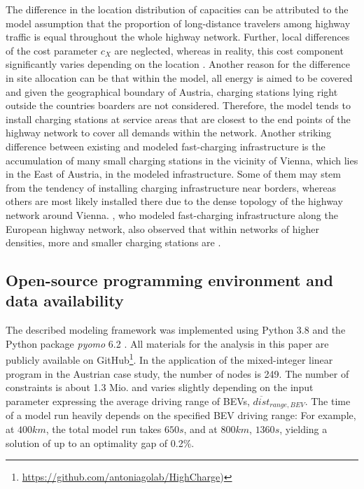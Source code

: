 \documentclass[journal,article,submit,pdftex,moreauthors]{Definitions/mdpi}
\begin{document}
    The difference in the location distribution of capacities can be attributed to the model assumption that the proportion of long-distance travelers among highway traffic is equal throughout the whole highway network. Further, local differences of the cost parameter $c_X$ are neglected, whereas in reality, this cost component significantly varies depending on the location \citep{Serradilla2017}. Another reason for the difference in site allocation can be that within the model, all energy is aimed to be covered and given the geographical boundary of Austria, charging stations lying right outside the countries boarders are not considered. Therefore, the model tends to install charging stations at service areas that are closest to the end points of the highway network to cover all demands within the network. Another striking difference between existing and modeled fast-charging infrastructure is the accumulation of many small charging stations in the vicinity of Vienna, which lies in the East of Austria, in the modeled infrastructure. Some of them may stem from the tendency of installing charging infrastructure near borders, whereas others are most likely installed there due to the dense topology of the highway network around Vienna. \citet{Jochem2019}, who modeled fast-charging infrastructure along the European highway network, also observed that within networks of higher densities, more and smaller charging stations are .   
    
    
    \subsection{Open-source programming environment and data availability}
    
    The described modeling framework was implemented using Python 3.8 and the Python package \textit{pyomo} 6.2 \cite{hart2011pyomo}. All materials for the analysis in this paper are publicly available on GitHub\footnote{\url{https://github.com/antoniagolab/HighCharge})}. In the application of the mixed-integer linear program in the Austrian case study, the number of nodes is 249. The number of constraints is about 1.3 Mio. and varies slightly depending on the input parameter expressing the average driving range of BEVs, $\overline{dist}_{range, BEV}$. The time of a model run heavily depends on the specified BEV driving range: For example, at $400km$, the total model run takes $650 s$, and at $800km$, $1360 s$, yielding a solution of up to an optimality gap of 0.2\%. 
 
\end{document}
